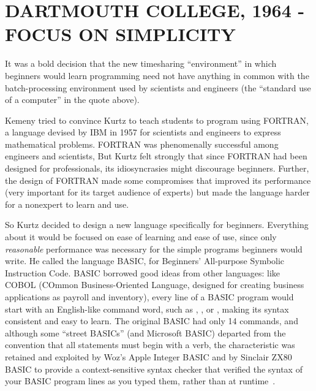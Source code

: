 
\section{DARTMOUTH COLLEGE, 1964 - FOCUS ON SIMPLICITY}




It was a bold decision that the new timesharing
``environment'' in which beginners would learn programming need not have
anything in common with the batch-processing environment used by
scientists and engineers (the ``standard use of a computer'' in the
quote above). 

Kemeny tried to convince Kurtz to teach students to program using FORTRAN, 
a language devised by IBM in 1957 for scientists and
engineers to express mathematical problems.  
FORTRAN was phenomenally successful among engineers and scientists,
But Kurtz felt strongly that since FORTRAN had
been designed for professionals,
its idiosyncrasies might discourage beginners.  Further, the design of
FORTRAN made some 
compromises that improved its performance (very important for its target
audience of experts) but made the language harder
for a nonexpert to learn and use.

So Kurtz decided to design a new language specifically for
beginners.
Everything about it would be focused on ease of learning and ease of
use, since only \emph{reasonable} performance was necessary for the
simple programs beginners would write.
He called the language BASIC, for Beginners' All-purpose Symbolic
Instruction Code.
BASIC borrowed good ideas from other languages:
like COBOL (COmmon Business-Oriented Language, designed for creating
business applications as payroll and inventory), every line of a BASIC
program would start with an English-like command word, such as
, , or , making its syntax consistent and easy
to learn.
The original BASIC had only 14 commands, 
and although some ``street BASICs'' (and Microsoft BASIC) departed from the
convention that all statements must begin with a verb, the characteristic
was retained and exploited by Woz's Apple Integer BASIC and by Sinclair
ZX80 BASIC 
to provide a context-sensitive syntax checker that verified the syntax
of your BASIC program lines as you typed them, rather than at
runtime~\cite{zx80_basic_techreport}.


